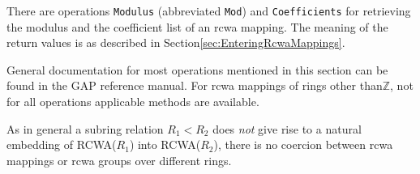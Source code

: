 \documentclass[a4paper,11pt]{report}
\begin{document}
{{\begin{Verbatim}[commandchars=!@|,fontsize=\small,frame=single,label=Example]
\end{Verbatim}
      There are operations \texttt{Modulus} (abbreviated \texttt{Mod}) and \texttt{Coefficients} for retrieving the modulus and the coefficient list of an rcwa mapping. The
meaning of the return values is as described in Section{\nobreakspace}\ref{sec:EnteringRcwaMappings}. 

 General documentation for most operations mentioned in this section can be
found in the \textsf{GAP} reference manual. For rcwa mappings of rings other
than{\nobreakspace}{\ensuremath{\mathbb Z}}, not for all operations applicable
methods are available. 

 As in general a subring relation $R_1<R_2$ does \emph{not} give rise to a natural embedding of RCWA($R_1$) into RCWA($R_2$), there is no coercion between rcwa mappings or rcwa groups over different
rings. }

  
}
\end{document}

